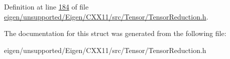 Definition at line \hyperlink{eigen_2unsupported_2_eigen_2_c_x_x11_2src_2_tensor_2_tensor_reduction_8h_source_l00184}{184} of file \hyperlink{eigen_2unsupported_2_eigen_2_c_x_x11_2src_2_tensor_2_tensor_reduction_8h_source}{eigen/unsupported/\+Eigen/\+C\+X\+X11/src/\+Tensor/\+Tensor\+Reduction.\+h}.



The documentation for this struct was generated from the following file\+:\begin{DoxyCompactItemize}
\item 
eigen/unsupported/\+Eigen/\+C\+X\+X11/src/\+Tensor/\+Tensor\+Reduction.\+h\end{DoxyCompactItemize}
